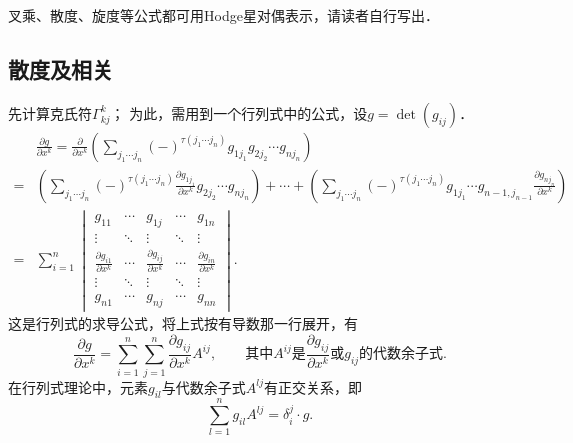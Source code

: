 叉乘、散度、旋度等公式都可用Hodge星对偶表示，请读者自行写出．





\subsection{散度及相关}
先计算克氏符$\Gamma^k_{kj}$；
为此，需用到一个行列式中的公式，设$g=\det(g_{ij})$．
\setlength{\mathindent}{0em}
\begin{align*}
    &\frac{\partial g}{\partial x^k}= \frac{\partial }{\partial x^k}
    \left( \sum_{j_1 \cdots j_n} (-)^{\tau(j_1 \cdots j_n)}
    g_{1 j_1} g_{2 j_2}\cdots g_{n j_n} \right) \\ %
    =&\left( \sum_{j_1 \cdots j_n} (-)^{\tau(j_1 \cdots j_n)}
    \frac{\partial g_{1 j_1}}{\partial x^k} g_{2 j_2}\cdots g_{n j_n} \right)
    +\cdots + \left( \sum_{j_1 \cdots j_n} (-)^{\tau(j_1 \cdots j_n)}
    g_{1 j_1} \cdots g_{n-1, j_{n-1}} \frac{\partial g_{n j_n}}{\partial x^k}  \right) \\
    =& \sum_{i=1}^{n}
    \begin{vmatrix}
        g_{1 1} & \cdots & g_{1 j} & \cdots & g_{1 n} \\
        \vdots & \ddots & \vdots & \ddots & \vdots \\
        \frac{\partial g_{i 1}}{\partial x^k} & \cdots &
           \frac{\partial g_{i j}}{\partial x^k} & \cdots &
           \frac{\partial g_{i n}}{\partial x^k} \\
        \vdots & \ddots & \vdots & \ddots & \vdots \\
        g_{n 1} & \cdots & g_{n j} & \cdots & g_{nn}
    \end{vmatrix} .
\end{align*}\setlength{\mathindent}{2em}
这是行列式的求导公式，将上式按有导数那一行展开，有
\begin{equation}\label{chrg:eqn_detga}
    \frac{\partial g}{\partial x^k}= \sum_{i=1}^{n} \sum_{j=1}^{n}
    \frac{\partial g_{ij}}{\partial x^k} A^{ij}, \qquad
    \text{其中}A^{ij}\text{是}\frac{\partial g_{ij}}{\partial x^k}\text{或}g_{ij}\text{的代数余子式}.
\end{equation}
在行列式理论中，元素$g_{il}$与代数余子式$A^{lj}$有正交关系，即
\begin{equation}
    \sum_{l=1}^{n}g_{il} A^{lj} = \delta_i^j \cdot g .
\end{equation}
